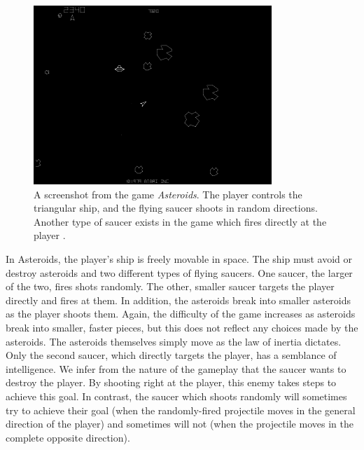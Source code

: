 \begin{figure}[H]
  \centering
  \includegraphics[width=9cm]{figures/Asteroids.png}
  \caption{A screenshot from the game \textit{Asteroids}. The player controls the triangular ship, and the flying saucer shoots in random directions. Another type of saucer exists in the game which fires directly at the player \cite{asteroids79}.}
  \label{fig:Asteroids}
\end{figure}

In Asteroids, the player's ship is freely movable in space. The ship must avoid or destroy asteroids and two different types of flying saucers. One saucer, the larger of the two, fires shots randomly. The other, smaller saucer targets the player directly and fires at them. In addition, the asteroids break into smaller asteroids as the player shoots them. Again, the difficulty of the game increases as asteroids break into smaller, faster pieces, but this does not reflect any choices made by the asteroids. The asteroids themselves simply move as the law of inertia dictates. Only the second saucer, which directly targets the player, has a semblance of intelligence. We infer from the nature of the gameplay that the saucer wants to destroy the player. By shooting right at the player, this enemy takes steps to achieve this goal. In contrast, the saucer which shoots randomly will sometimes try to achieve their goal (when the randomly-fired projectile moves in the general direction of the player) and sometimes will not (when the projectile moves in the complete opposite direction).\\

